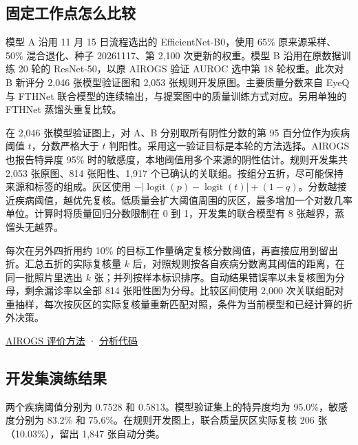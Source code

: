 \documentclass[
  10pt,
  letterpaper,
]{article}
\begin{document}
\subsection{固定工作点怎么比较}\label{ux56faux5b9aux5de5ux4f5cux70b9ux600eux4e48ux6bd4ux8f83}

模型 A 沿用 11 月 15 日流程选出的 EfficientNet-B0，使用 65\%
原来源采样、50\% 混合退化、种子 20261117、第 2,100 次更新的权重。模型 B
沿用在原数据训练 20 轮的 ResNet-50，以原 AIROGS 验证 AUROC 选中第 18
轮权重。此次对 B 新评分 2,046 张模型验证图和 2,053
张规则开发原图。主要质量分数来自 EyeQ 与 FTHNet
联合模型的连续输出，与提案图中的质量训练方式对应。另用单独的 FTHNet
蒸馏头重复比较。

在 2,046 张模型验证图上，对 A、B 分别取所有阴性分数的第 95
百分位作为疾病阈值 \(t\)，分数严格大于 \(t\)
判阳性。采用这一验证目标是本轮的方法选择。AIROGS 也报告特异度 95\%
时的敏感度，本地阈值用多个来源的阴性估计。规则开发集共 2,053 张原图、814
张阳性、1,917
个已确认的关联组。按组分五折，尽可能保持来源和标签的组成。灰区使用
\(-|\operatorname{logit}(p)-\operatorname{logit}(t)|+(1-q)\)。分数越接近疾病阈值，越优先复核。低质量会扩大阈值周围的灰区，最多增加一个对数几率单位。计算时将质量回归分数限制在
0 到 1，开发集的联合模型有 8 张越界，蒸馏头无越界。

每次在另外四折用约 10\%
的目标工作量确定复核分数阈值，再直接应用到留出折。汇总五折的实际复核量
\(k\) 后，对照规则按各自疾病分数离其阈值的距离，在同一批照片里选出 \(k\)
张；并列按样本标识排序。自动结果错误率以未复核图为分母，剩余漏诊率以全部
814 张阳性图为分母。比较区间使用 2,000
次关联组配对重抽样，每次按灰区的实际复核量重新匹配对照，条件为当前模型和已经计算的折外决策。

\href{https://arxiv.org/html/2302.01738}{AIROGS 评价方法} ·
\href{../../../tools/rehearse_proposal_review_20261116.py}{分析代码}

\clearpage
\subsection{开发集演练结果}\label{ux5f00ux53d1ux96c6ux6f14ux7ec3ux7ed3ux679c}

两个疾病阈值分别为 0.7528 和 0.5813。模型验证集上的特异度均为
95.0\%，敏感度分别为 83.2\% 和
75.6\%。在规则开发图上，联合质量灰区实际复核 206 张（10.03\%），留出
1,847 张自动分类。
\end{document}
